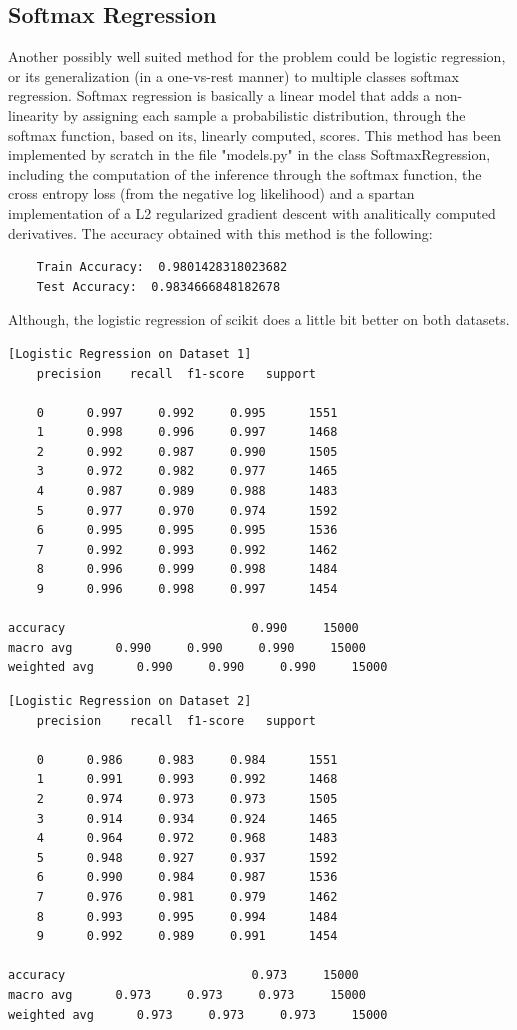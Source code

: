 \documentclass[12pt,a4paper,oneside]{article}
\begin{document}
\subsection{Softmax Regression}

Another possibly well suited method for the problem could be logistic
regression, or its generalization (in a one-vs-rest manner) to multiple classes
softmax regression. Softmax regression is basically a linear model that adds a
non-linearity by assigning each sample a probabilistic distribution, through the
softmax function, based on its, linearly computed, scores. This method has been
implemented by scratch in the file "models.py" in the class SoftmaxRegression,
including the computation of the inference through the softmax function, the
cross entropy loss (from the negative log likelihood) and a spartan
implementation of a L2 regularized gradient descent with analitically computed
derivatives. The accuracy obtained with this method is the following:

\begin{verbatim}
    Train Accuracy:  0.9801428318023682
    Test Accuracy:  0.9834666848182678
\end{verbatim}

Although, the logistic regression of scikit does a little bit better on both datasets.

\begin{verbatim}[Logistic Regression on Dataset 1]
    precision    recall  f1-score   support

    0      0.997     0.992     0.995      1551
    1      0.998     0.996     0.997      1468
    2      0.992     0.987     0.990      1505
    3      0.972     0.982     0.977      1465
    4      0.987     0.989     0.988      1483
    5      0.977     0.970     0.974      1592
    6      0.995     0.995     0.995      1536
    7      0.992     0.993     0.992      1462
    8      0.996     0.999     0.998      1484
    9      0.996     0.998     0.997      1454

accuracy                          0.990     15000
macro avg      0.990     0.990     0.990     15000
weighted avg      0.990     0.990     0.990     15000
\end{verbatim}

\begin{verbatim}[Logistic Regression on Dataset 2]
    precision    recall  f1-score   support

    0      0.986     0.983     0.984      1551
    1      0.991     0.993     0.992      1468
    2      0.974     0.973     0.973      1505
    3      0.914     0.934     0.924      1465
    4      0.964     0.972     0.968      1483
    5      0.948     0.927     0.937      1592
    6      0.990     0.984     0.987      1536
    7      0.976     0.981     0.979      1462
    8      0.993     0.995     0.994      1484
    9      0.992     0.989     0.991      1454

accuracy                          0.973     15000
macro avg      0.973     0.973     0.973     15000
weighted avg      0.973     0.973     0.973     15000
\end{verbatim}
\end{document}
